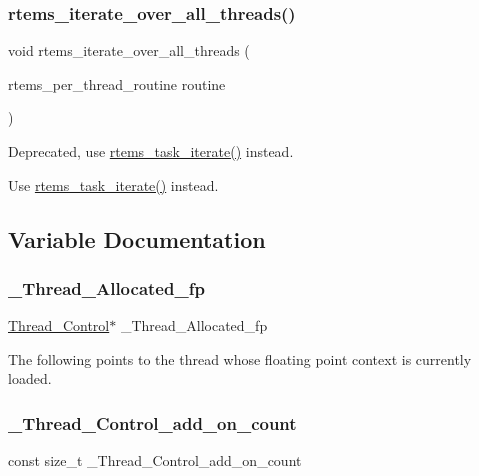 \subsubsection{\texorpdfstring{rtems\_iterate\_over\_all\_threads()}{rtems\_iterate\_over\_all\_threads()}}
{\footnotesize\ttfamily void rtems\+\_\+iterate\+\_\+over\+\_\+all\+\_\+threads (\begin{DoxyParamCaption}\item[{rtems\+\_\+per\+\_\+thread\+\_\+routine}]{routine }\end{DoxyParamCaption})}



Deprecated, use \mbox{\hyperlink{group__ClassicTasks_ga7255f41eb20238aebe5ce139d5dfd97d}{rtems\+\_\+task\+\_\+iterate()}} instead. 

Use \mbox{\hyperlink{group__ClassicTasks_ga7255f41eb20238aebe5ce139d5dfd97d}{rtems\+\_\+task\+\_\+iterate()}} instead. 

\subsection{Variable Documentation}
\mbox{\label{group__RTEMSScoreThread_ga87bfa1f152fd21a58c739c76cf260527}} 
\subsubsection{\texorpdfstring{\_Thread\_Allocated\_fp}{\_Thread\_Allocated\_fp}}
{\footnotesize\ttfamily \mbox{\hyperlink{struct__Thread__Control}{Thread\+\_\+\+Control}}$\ast$ \+\_\+\+Thread\+\_\+\+Allocated\+\_\+fp}

The following points to the thread whose floating point context is currently loaded. \mbox{\label{group__RTEMSScoreThread_ga93f9a4600ed05daba5da3a8111393fbb}} 
\subsubsection{\texorpdfstring{\_Thread\_Control\_add\_on\_count}{\_Thread\_Control\_add\_on\_count}}
{\footnotesize\ttfamily const size\+\_\+t \+\_\+\+Thread\+\_\+\+Control\+\_\+add\+\_\+on\+\_\+count}



